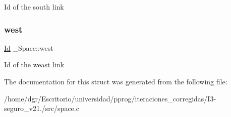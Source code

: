 Id of the south link \mbox{\label{struct__Space_a20c1d259e93b44e24ba82982e142eb9b}} 
\subsubsection{\texorpdfstring{west}{west}}
{\footnotesize\ttfamily \hyperlink{types_8h_a845e604fb28f7e3d97549da3448149d3}{Id} \+\_\+\+Space\+::west}

Id of the weast link 

The documentation for this struct was generated from the following file\+:\begin{DoxyCompactItemize}
\item 
/home/dgr/\+Escritorio/universidad/pprog/iteraciones\+\_\+corregidas/\+I3-\/seguro\+\_\+v21./src/space.\+c\end{DoxyCompactItemize}
